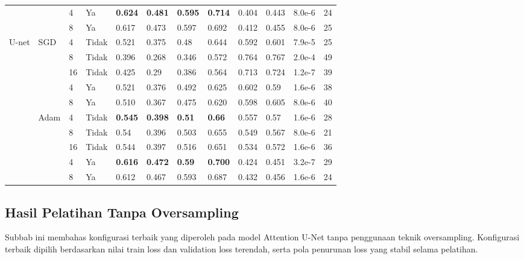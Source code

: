 \begin{landscape}
\begin{table}[]
\begin{tabular}{@{}llllllllllll@{}}
		&  & 4  & Ya    & \textbf{0.624} & \textbf{0.481} & \textbf{0.595} & \textbf{0.714} & 0.404 & 0.443  & 8.0e-6 & 24 \\
		&  & 8  & Ya    & 0.617          & 0.473          & 0.597          & 0.692          & 0.412 & 0.455  & 8.0e-6 & 25 \\ \midrule
		\multirow{10}{*}{U-net} &
		\multirow{5}{*}{SGD} &
		4 &
		Tidak &
		0.521 &
		0.375 &
		0.48 &
		0.644 &
		0.592 &
		0.601 &
		7.9e-5 &
		25 \\
		&  & 8  & Tidak & 0.396          & 0.268          & 0.346          & 0.572          & 0.764 & 0.767  & 2.0e-4 & 49 \\
		&  & 16 & Tidak & 0.425          & 0.29           & 0.386          & 0.564          & 0.713 & 0.724  & 1.2e-7 & 39 \\ \cmidrule(l){3-12} 
		&  & 4  & Ya    & 0.521          & 0.376          & 0.492          & 0.625          & 0.602 & 0.59   & 1.6e-6 & 38 \\
		&  & 8  & Ya    & 0.510          & 0.367          & 0.475          & 0.620          & 0.598 & 0.605  & 8.0e-6 & 40 \\ \cmidrule(l){2-12} 
		&
		\multirow{5}{*}{Adam} &
		4 &
		Tidak &
		\textbf{0.545} &
		\textbf{0.398} &
		\textbf{0.51} &
		\textbf{0.66} &
		0.557 &
		0.57 &
		1.6e-6 &
		28 \\
		&  & 8  & Tidak & 0.54           & 0.396          & 0.503          & 0.655          & 0.549 & 0.567  & 8.0e-6 & 21 \\
		&  & 16 & Tidak & 0.544          & 0.397          & 0.516          & 0.651          & 0.534 & 0.572  & 1.6e-6 & 36 \\ \cmidrule(l){3-12} 
		&  & 4  & Ya    & \textbf{0.616} & \textbf{0.472} & \textbf{0.59}  & \textbf{0.700} & 0.424 & 0.451  & 3.2e-7 & 29 \\
		&  & 8  & Ya    & 0.612          & 0.467          & 0.593          & 0.687          & 0.432 & 0.456  & 1.6e-6 & 24 \\ \bottomrule
	\end{tabular}
\end{table}
\end{landscape}

\subsection{Hasil Pelatihan Tanpa Oversampling}

\noindent Subbab ini membahas konfigurasi terbaik yang diperoleh pada model Attention U-Net tanpa penggunaan teknik oversampling. Konfigurasi terbaik dipilih berdasarkan nilai train loss dan validation loss terendah, serta pola penurunan loss yang stabil selama pelatihan.

